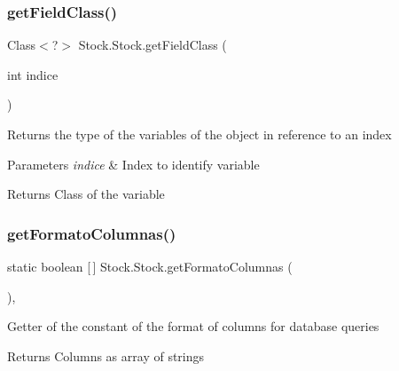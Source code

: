 \subsubsection{\texorpdfstring{get\+Field\+Class()}{getFieldClass()}}
{\footnotesize\ttfamily Class$<$?$>$ Stock.\+Stock.\+get\+Field\+Class (\begin{DoxyParamCaption}\item[{int}]{indice }\end{DoxyParamCaption})\hspace{0.3cm}{\ttfamily [inline]}}

Returns the type of the variables of the object in reference to an index


\begin{DoxyParams}{Parameters}
{\em indice} & Index to identify variable \\
\hline
\end{DoxyParams}
\begin{DoxyReturn}{Returns}
Class of the variable 
\end{DoxyReturn}
\mbox{\label{class_stock_1_1_stock_a69b313abfef5b90dcdf378ea5a711618}} 
\subsubsection{\texorpdfstring{get\+Formato\+Columnas()}{getFormatoColumnas()}}
{\footnotesize\ttfamily static boolean \mbox{[}$\,$\mbox{]} Stock.\+Stock.\+get\+Formato\+Columnas (\begin{DoxyParamCaption}{ }\end{DoxyParamCaption})\hspace{0.3cm}{\ttfamily [inline]}, {\ttfamily [static]}}

Getter of the constant of the format of columns for database queries

\begin{DoxyReturn}{Returns}
Columns as array of strings 
\end{DoxyReturn}
\mbox{\label{class_stock_1_1_stock_acecc43ec5fb13d91e02be7394af1130b}} 

